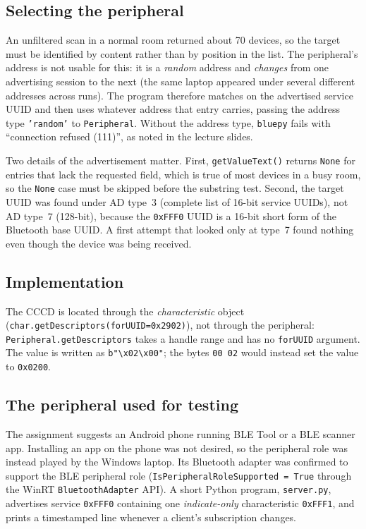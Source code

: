 \documentclass[11pt,a4paper]{article}
\begin{document}
\subsection{Selecting the peripheral}

An unfiltered scan in a normal room returned about 70 devices, so the target
must be identified by content rather than by position in the list. The
peripheral's address is not usable for this: it is a \emph{random} address and
\emph{changes} from one advertising session to the next (the same laptop
appeared under several different addresses across runs). The program therefore
matches on the advertised service UUID and then uses whatever address that
entry carries, passing the address type \texttt{'random'} to
\texttt{Peripheral}. Without the address type, \texttt{bluepy} fails with
``connection refused (111)'', as noted in the lecture slides.

Two details of the advertisement matter. First, \texttt{getValueText()}
returns \texttt{None} for entries that lack the requested field, which is true
of most devices in a busy room, so the \texttt{None} case must be skipped
before the substring test. Second, the target UUID was found under AD type~3
(complete list of 16-bit service UUIDs), not AD type~7 (128-bit), because the
\texttt{0xFFF0} UUID is a 16-bit short form of the Bluetooth base UUID. A first
attempt that looked only at type~7 found nothing even though the device was
being received.

\subsection{Implementation}



The CCCD is located through the \emph{characteristic} object
(\texttt{char.getDescriptors(forUUID=0x2902)}), not through the peripheral:
\texttt{Peripheral.getDescriptors} takes a handle range and has no
\texttt{forUUID} argument. The value is written as \verb|b"\x02\x00"|; the bytes \texttt{00 02} would instead set the value
to \texttt{0x0200}.

\subsection{The peripheral used for testing}
\label{sec:deviation}

The assignment suggests an Android phone running BLE Tool or a BLE scanner
app. Installing an app on the phone was not desired, so the peripheral role was
instead played by the Windows laptop. Its Bluetooth adapter was confirmed to
support the BLE peripheral role (\texttt{IsPeripheralRoleSupported = True}
through the WinRT \texttt{BluetoothAdapter} API). A short Python program,
\texttt{server.py}, advertises service \texttt{0xFFF0} containing one
\emph{indicate-only} characteristic \texttt{0xFFF1}, and prints a timestamped
line whenever a client's subscription changes.
\end{document}
